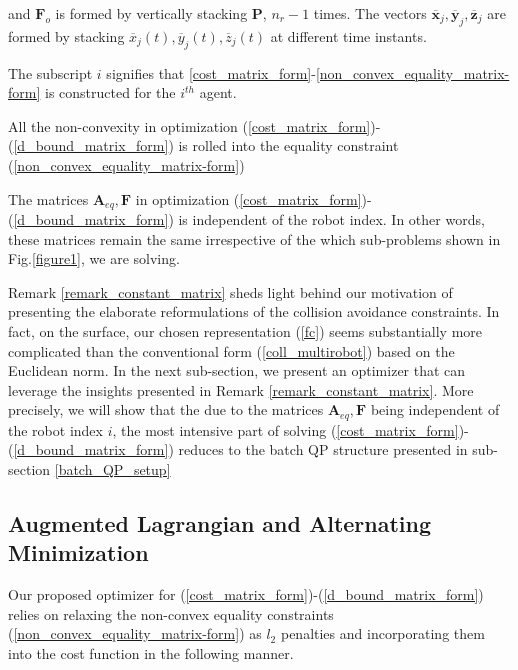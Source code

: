\noindent and $\textbf{F}_{o}$ is formed by vertically stacking $\textbf{P}$, $n_r-1$ times. The vectors $\overline{\textbf{x}}_j,\overline{\textbf{y}}_j, \overline{\textbf{z}}_j$ are formed by stacking $\overline{x}_j(t), \overline{y}_j(t), \overline{z}_j(t) $ at different time instants.

\begin{remark}\label{i_th_agent_remark}

The subscript $i$ signifies that \eqref{cost_matrix_form}-\eqref{non_convex_equality_matrix-form} is constructed for the $i^{th}$ agent.

\end{remark}

\begin{remark}\label{non_convexity_roll}
All the non-convexity in optimization (\ref{cost_matrix_form})-(\ref{d_bound_matrix_form}) is rolled into the equality constraint (\ref{non_convex_equality_matrix-form})
\end{remark}

\begin{remark} \label{remark_constant_matrix}
The matrices $\textbf{A}_{eq}, \textbf{F}$ in optimization (\ref{cost_matrix_form})-(\ref{d_bound_matrix_form}) is independent of the robot index. In other words, these matrices remain the same irrespective of the which sub-problems shown in Fig.\ref{figure1}, we are solving.
\end{remark}

\noindent Remark \ref{remark_constant_matrix} sheds light behind our motivation of presenting the elaborate reformulations of the collision avoidance constraints. In fact, on the surface, our chosen representation (\ref{fc}) seems substantially more complicated than the conventional form (\ref{coll_multirobot}) based on the Euclidean norm. In the next sub-section, we present an optimizer that can leverage the insights presented in Remark \ref{remark_constant_matrix}. More precisely, we will show that the due to the matrices $\textbf{A}_{eq}, \textbf{F}$ being independent of the robot index $i$, the  most intensive part of solving (\ref{cost_matrix_form})-(\ref{d_bound_matrix_form}) reduces to the batch QP structure presented in sub-section \ref{batch_QP_setup}

\subsection{Augmented Lagrangian and Alternating Minimization}
\noindent Our proposed optimizer for (\ref{cost_matrix_form})-(\ref{d_bound_matrix_form}) relies on relaxing the non-convex equality constraints (\ref{non_convex_equality_matrix-form}) as $l_2$ penalties and incorporating them into the cost function in the following manner.

